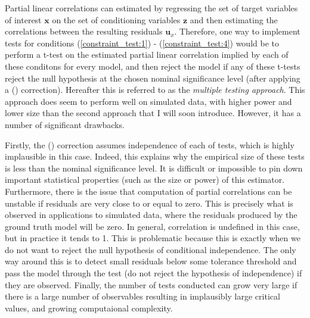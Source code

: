 \documentclass{article}
\begin{document}
Partial linear correlations can estimated by regressing the set of target variables of interest $\mathbf{x}$ on the set of conditioning variables $\mathbf{z}$ and then estimating the correlations between the resulting residuals $\mathbf{u}_x$. Therefore, one way to implement tests for conditions (\ref{constraint_test:1}) - (\ref{constraint_test:4}) would be to perform a t-test on the estimated partial linear correlation implied by each of these conditons for every model, and then reject the model if any of these t-tests reject the null hypothesis at the chosen nominal significance level (after applying a \citeauthor{bonferroni1936teoria} (\citeyear{bonferroni1936teoria}) correction). Hereafter this is referred to as the \textit{multiple testing approach}. This approach does seem to perform well on simulated data, with higher power and lower size than the second approach that I will soon introduce. However, it has a number of significant drawbacks. 

Firstly, the \citeauthor{bonferroni1936teoria} (\citeyear{bonferroni1936teoria}) correction assumes independence of each of tests, which is highly implausible in this case. Indeed, this explains why the empirical size of these tests is less than the nominal significance level. It is difficult or impossible to pin down important statistical properties (such as the size or power) of this estimator. Furthermore, there is the issue that computation of partial correlations can be unstable if residuals are very close to or equal to zero. This is precisely what is observed in applications to simulated data, where the residuals produced by the ground truth model will be zero. In general, correlation is undefined in this case, but in practice it tends to 1. This is problematic because this is exactly when we do not want to reject the null hypothesis of conditional independence. The only way around this is to detect small residuals below some tolerance threshold and pass the model through the test (do not reject the hypothesis of independence) if they are observed. Finally, the number of tests conducted can grow very large if there is a large number of observables resulting in implausibly large critical values, and growing computaional complexity.
\end{document}
